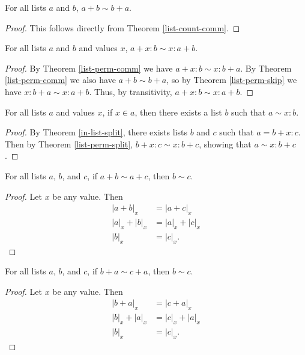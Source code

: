 \documentclass[../math.tex]{subfiles}
\begin{document}
\begin{theorem} \label{list-perm-comm}
    For all lists $a$ and $b$, $a + b \sim b + a$.
\end{theorem}
\begin{proof}
    This follows directly from Theorem \ref{list-count-comm}.
\end{proof}

\begin{theorem} \label{list-perm-split}
    For all lists $a$ and $b$ and values $x$, $a + x : b \sim x : a + b$.
\end{theorem}
\begin{proof}
    By Theorem \ref{list-perm-comm} we have $a + x : b \sim x : b + a$.  By
    Theorem \ref{list-perm-comm} we also have $a + b \sim b + a$, so by Theorem
    \ref{list-perm-skip} we have $x : b + a \sim x : a + b$.  Thus, by
    transitivity, $a + x : b \sim x : a + b$.
\end{proof}

\begin{theorem} \label{list-split-perm}
    For all lists $a$ and values $x$, if $x \in a$, then there exists a list $b$
    such that $a \sim x : b$.
\end{theorem}
\begin{proof}
    By Theorem \ref{in-list-split}, there exists lists $b$ and $c$ such that $a
    = b + x : c$.  Then by Theorem \ref{list-perm-split}, $b + x : c \sim x : b
    + c$, showing that $a \sim x : b + c$.
\end{proof}

\begin{theorem} \label{list-perm-conc-lcancel}
    For all lists $a$, $b$, and $c$, if $a + b \sim a + c$, then $b \sim c$.
\end{theorem}
\begin{proof}
    Let $x$ be any value.  Then
    \begin{align*}
        |a + b|_x &= |a + c|_x \\
        |a|_x + |b|_x &= |a|_x + |c|_x \\
        |b|_x &= |c|_x.
    \end{align*}
\end{proof}

\begin{theorem} \label{list-perm-conc-rcancel}
    For all lists $a$, $b$, and $c$, if $b + a \sim c + a$, then $b \sim c$.
\end{theorem}
\begin{proof}
    Let $x$ be any value.  Then
    \begin{align*}
        |b + a|_x &= |c + a|_x \\
        |b|_x + |a|_x &= |c|_x + |a|_x \\
        |b|_x &= |c|_x.
    \end{align*}
\end{proof}
\end{document}
